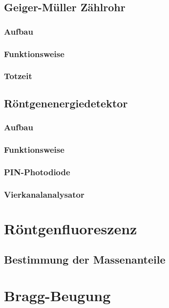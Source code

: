 \subsection{Geiger-Müller Zählrohr}

\subsubsection{Aufbau}

\subsubsection{Funktionsweise}

\subsubsection{Totzeit}

\subsection{Röntgenenergiedetektor}

\subsubsection{Aufbau}

\subsubsection{Funktionsweise}

\subsubsection{PIN-Photodiode}

\subsubsection{Vierkanalanalysator}

\section{Röntgenfluoreszenz}

\subsection{Bestimmung der Massenanteile}

\section{Bragg-Beugung}

